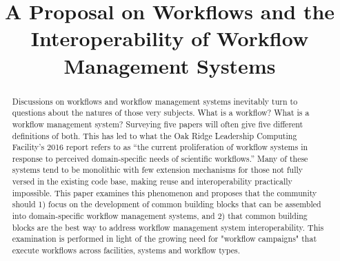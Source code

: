 \documentclass[conference]{IEEEtran}
\begin{document}
\title{A Proposal on Workflows and the Interoperability of Workflow Management Systems}

\author{
\and
{}
\and
{}
}

\maketitle

\begin{abstract}

Discussions on workflows and workflow management systems inevitably turn to questions about the natures of those very subjects. What is a workflow? What is a workflow management system? Surveying five papers will often give five different definitions of both. This has led to what the Oak Ridge Leadership Computing Facility’s 2016 report refers to as “the current proliferation of workflow systems in response to perceived domain-specific needs of scientific workflows.” Many of these systems tend to be monolithic with few extension mechanisms for those not fully versed in the existing code base, making reuse and interoperability practically impossible. This paper examines this phenomenon and proposes that the community should 1) focus on the development of common building blocks that can be assembled into domain-specific workflow management systems, and 2) that common building blocks are the best way to address workflow management system interoperability. This examination is performed in light of the growing need for "workflow campaigns" that execute workflows across facilities, systems and workflow types.

\end{abstract}
\end{document}
